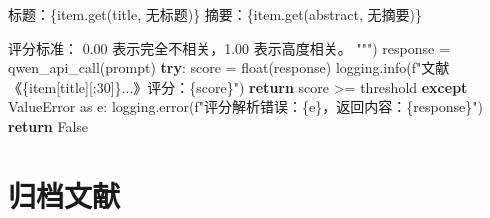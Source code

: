 \documentclass[
  letterpaper,
  DIV=11,
  numbers=noendperiod]{scrreprt}
\newenvironment{Shaded}{\begin{snugshade}}{\end{snugshade}}
\newcommand{\BuiltInTok}[1]{\textcolor[rgb]{0.00,0.23,0.31}{#1}}
\newcommand{\ControlFlowTok}[1]{\textcolor[rgb]{0.00,0.23,0.31}{\textbf{#1}}}
\newcommand{\DecValTok}[1]{\textcolor[rgb]{0.68,0.00,0.00}{#1}}
\newcommand{\ImportTok}[1]{\textcolor[rgb]{0.00,0.46,0.62}{#1}}
\newcommand{\NormalTok}[1]{\textcolor[rgb]{0.00,0.23,0.31}{#1}}
\newcommand{\OperatorTok}[1]{\textcolor[rgb]{0.37,0.37,0.37}{#1}}
\newcommand{\PreprocessorTok}[1]{\textcolor[rgb]{0.68,0.00,0.00}{#1}}
\newcommand{\SpecialCharTok}[1]{\textcolor[rgb]{0.37,0.37,0.37}{#1}}
\newcommand{\SpecialStringTok}[1]{\textcolor[rgb]{0.13,0.47,0.30}{#1}}
\newcommand{\StringTok}[1]{\textcolor[rgb]{0.13,0.47,0.30}{#1}}
\newcommand{\VariableTok}[1]{\textcolor[rgb]{0.07,0.07,0.07}{#1}}
\begin{document}
\begin{Shaded}
\begin{Highlighting}[]
\SpecialStringTok{        标题：}\SpecialCharTok{\{}\NormalTok{item}\SpecialCharTok{.}\NormalTok{get(}\StringTok{\textquotesingle{}title\textquotesingle{}}\NormalTok{, }\StringTok{\textquotesingle{}无标题\textquotesingle{}}\NormalTok{)}\SpecialCharTok{\}}
\SpecialStringTok{        摘要：}\SpecialCharTok{\{}\NormalTok{item}\SpecialCharTok{.}\NormalTok{get(}\StringTok{\textquotesingle{}abstract\textquotesingle{}}\NormalTok{, }\StringTok{\textquotesingle{}无摘要\textquotesingle{}}\NormalTok{)}\SpecialCharTok{\}}

\SpecialStringTok{        评分标准：}
\SpecialStringTok{        0.00 表示完全不相关，1.00 表示高度相关。}
\SpecialStringTok{    """}\NormalTok{)}
\NormalTok{    response }\OperatorTok{=}\NormalTok{ qwen\_api\_call(prompt)}
    \ControlFlowTok{try}\NormalTok{:}
\NormalTok{        score }\OperatorTok{=} \BuiltInTok{float}\NormalTok{(response)}
\NormalTok{        logging.info(}\SpecialStringTok{f"文献《}\SpecialCharTok{\{}\NormalTok{item[}\StringTok{\textquotesingle{}title\textquotesingle{}}\NormalTok{][:}\DecValTok{30}\NormalTok{]}\SpecialCharTok{\}}\SpecialStringTok{...》评分：}\SpecialCharTok{\{}\NormalTok{score}\SpecialCharTok{\}}\SpecialStringTok{"}\NormalTok{)}
        \ControlFlowTok{return}\NormalTok{ score }\OperatorTok{\textgreater{}=}\NormalTok{ threshold}
    \ControlFlowTok{except} \PreprocessorTok{ValueError} \ImportTok{as}\NormalTok{ e:}
\NormalTok{        logging.error(}\SpecialStringTok{f"评分解析错误：}\SpecialCharTok{\{}\NormalTok{e}\SpecialCharTok{\}}\SpecialStringTok{，返回内容：}\SpecialCharTok{\{}\NormalTok{response}\SpecialCharTok{\}}\SpecialStringTok{"}\NormalTok{)}
        \ControlFlowTok{return} \VariableTok{False}
\end{Highlighting}
\end{Shaded}

\section{归档文献}\label{ux5f52ux6863ux6587ux732e}
\end{document}
